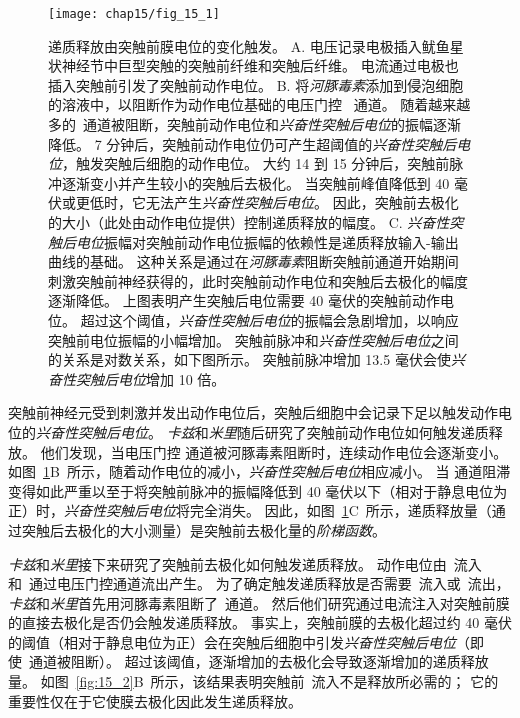 \begin{figure}[htbp]
	\centering
	\texttt{[image: chap15/fig\_15\_1]}
	\caption{递质释放由突触前膜电位的变化触发\cite{katz1967study}。
	A. 电压记录电极插入鱿鱼星状神经节中巨型突触的突触前纤维和突触后纤维。
	电流通过电极也插入突触前引发了突触前动作电位。
	B. 将\textit{河豚毒素}添加到侵泡细胞的溶液中，以阻断作为动作电位基础的电压门控~ 通道。
	随着越来越多的~通道被阻断，突触前动作电位和\textit{兴奋性突触后电位}的振幅逐渐降低。
	7 分钟后，突触前动作电位仍可产生超阈值的\textit{兴奋性突触后电位}，触发突触后细胞的动作电位。
	大约 14 到 15 分钟后，突触前脉冲逐渐变小并产生较小的突触后去极化。
	当突触前峰值降低到 40 毫伏或更低时，它无法产生\textit{兴奋性突触后电位}。
	因此，突触前去极化的大小（此处由动作电位提供）控制递质释放的幅度。
	C. \textit{兴奋性突触后电位}振幅对突触前动作电位振幅的依赖性是递质释放输入-输出曲线的基础。
	这种关系是通过在\textit{河豚毒素}阻断突触前通道开始期间刺激突触前神经获得的，此时突触前动作电位和突触后去极化的幅度逐渐降低。
	上图表明产生突触后电位需要 40 毫伏的突触前动作电位。
	超过这个阈值，\textit{兴奋性突触后电位}的振幅会急剧增加，以响应突触前电位振幅的小幅增加。
	突触前脉冲和\textit{兴奋性突触后电位}之间的关系是对数关系，如下图所示。
	突触前脉冲增加 13.5 毫伏会使\textit{兴奋性突触后电位}增加 10 倍。}
	\label{fig:15_1}
\end{figure}
突触前神经元受到刺激并发出动作电位后，突触后细胞中会记录下足以触发动作电位的\textit{兴奋性突触后电位}。
\textit{卡兹}和\textit{米里}随后研究了突触前动作电位如何触发递质释放。
他们发现，当电压门控  通道被河豚毒素阻断时，连续动作电位会逐渐变小。
如图~\ref{fig:15_1}B~所示，随着动作电位的减小，\textit{兴奋性突触后电位}相应减小。
当  通道阻滞变得如此严重以至于将突触前脉冲的振幅降低到 40 毫伏以下（相对于静息电位为正）时，\textit{兴奋性突触后电位}将完全消失。
因此，如图~\ref{fig:15_1}C~所示，递质释放量（通过突触后去极化的大小测量）是突触前去极化量的\textit{阶梯函数}。


\textit{卡兹}和\textit{米里}接下来研究了突触前去极化如何触发递质释放。
动作电位由~流入和~通过电压门控通道流出产生。
为了确定触发递质释放是否需要~流入或~流出，\textit{卡兹}和\textit{米里}首先用河豚毒素阻断了~通道。
然后他们研究通过电流注入对突触前膜的直接去极化是否仍会触发递质释放。
事实上，突触前膜的去极化超过约 40 毫伏的阈值（相对于静息电位为正）会在突触后细胞中引发\textit{兴奋性突触后电位}（即使~通道被阻断）。
超过该阈值，逐渐增加的去极化会导致逐渐增加的递质释放量。
如图~\ref{fig:15_2}B~所示，该结果表明突触前~流入不是释放所必需的；
它的重要性仅在于它使膜去极化因此发生递质释放。


